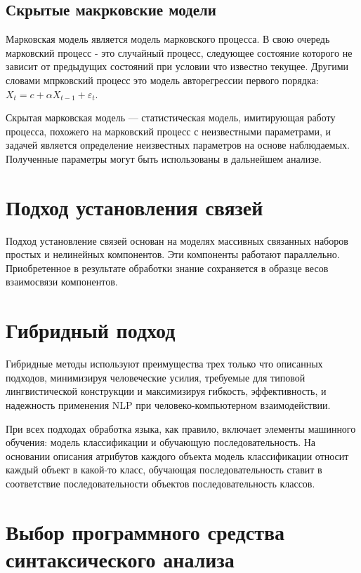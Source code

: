 \documentclass{standalone}
\begin{document}
\subsection{Скрытые макрковские модели} %
\par Марковская модель является модель марковского процесса. В свою очередь марковский процесс - это случайный процесс, следующее состояние которого не зависит от предыдущих состояний при условии что известно текущее. Другими словами мпрковский процесс это модель авторегрессии первого порядка: \(X_t = c + \alpha X_{t-1} + \varepsilon_t \).
\par Скрытая марковская модель — статистическая модель, имитирующая работу процесса, похожего на марковский процесс с неизвестными параметрами, и задачей является определение неизвестных параметров на основе наблюдаемых. Полученные параметры могут быть использованы в дальнейшем анализе.

\section{Подход установления связей}
\par Подход установление связей основан на моделях массивных связанных наборов простых и нелинейных компонентов. Эти компоненты работают параллельно. Приобретенное в результате обработки знание сохраняется в образце весов взаимосвязи компонентов.
\section{Гибридный подход}
\par Гибридные методы используют преимущества трех только что описанных подходов, минимизируя человеческие усилия, требуемые для типовой лингвистической конструкции и максимизируя гибкость, эффективность, и надежность применения NLP при человеко-компьютерном взаимодействии.

\par При всех подходах обработка языка, как правило, включает элементы машинного обучения: модель классификации и обучающую последовательность. На основании описания атрибутов каждого объекта модель классификации относит каждый объект в какой-то класс, обучающая последовательность ставит в соответствие последовательности объектов последовательность классов.

\section{Выбор программного средства синтаксического анализа}
\end{document}
